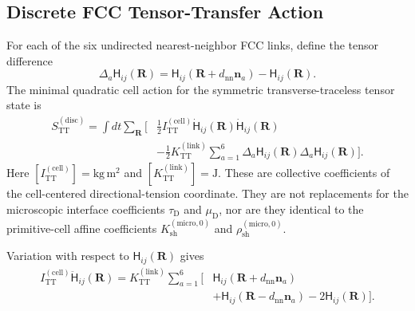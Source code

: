 \subsection{Discrete FCC Tensor-Transfer Action}
\label{subsec:discrete_fcc_action}

For each of the six undirected nearest-neighbor FCC links, define the tensor difference
\begin{equation}
    \Delta_{a}\mathsf{H}_{ij}(\mathbf{R}) = \mathsf{H}_{ij} \left( \mathbf{R} + d_{\mathrm{nn}}\mathbf{n}_{a} \right) - \mathsf{H}_{ij}(\mathbf{R}).
\end{equation}
The minimal quadratic cell action for the symmetric transverse-traceless tensor state is
\begin{equation}
    \begin{aligned}
        S_{\mathrm{TT}}^{(\mathrm{disc})} = \int dt \sum_{\mathbf{R}} \Bigg[ &\frac{1}{2} I_{\mathrm{TT}}^{(\mathrm{cell})} \dot{\mathsf{H}}_{ij}(\mathbf{R}) \dot{\mathsf{H}}_{ij}(\mathbf{R}) \\
        &- \frac{1}{2} K_{\mathrm{TT}}^{(\mathrm{link})} \sum_{a=1}^{6} \Delta_{a}\mathsf{H}_{ij}(\mathbf{R}) \Delta_{a}\mathsf{H}_{ij}(\mathbf{R}) \Bigg].
    \end{aligned}
\end{equation}
Here $[I_{\mathrm{TT}}^{(\mathrm{cell})}] = \mathrm{kg\,m^{2}}$ and $[K_{\mathrm{TT}}^{(\mathrm{link})}] = \mathrm{J}$. These are collective coefficients of the cell-centered directional-tension coordinate. They are not replacements for the microscopic interface coefficients $\tau_{\mathrm{D}}$ and $\mu_{\mathrm{D}}$, nor are they identical to the primitive-cell affine coefficients $K_{\mathrm{sh}}^{(\mathrm{micro},0)}$ and $\rho_{\mathrm{sh}}^{(\mathrm{micro},0)}$.

Variation with respect to $\mathsf{H}_{ij}(\mathbf{R})$ gives
\begin{equation}
    \begin{aligned}
        I_{\mathrm{TT}}^{(\mathrm{cell})} \ddot{\mathsf{H}}_{ij}(\mathbf{R}) = K_{\mathrm{TT}}^{(\mathrm{link})} \sum_{a=1}^{6} \Big[ &\mathsf{H}_{ij} \left( \mathbf{R} + d_{\mathrm{nn}}\mathbf{n}_{a} \right) \\
        &+ \mathsf{H}_{ij} \left( \mathbf{R} - d_{\mathrm{nn}}\mathbf{n}_{a} \right) - 2\mathsf{H}_{ij}(\mathbf{R}) \Big].
    \end{aligned}
\end{equation}

